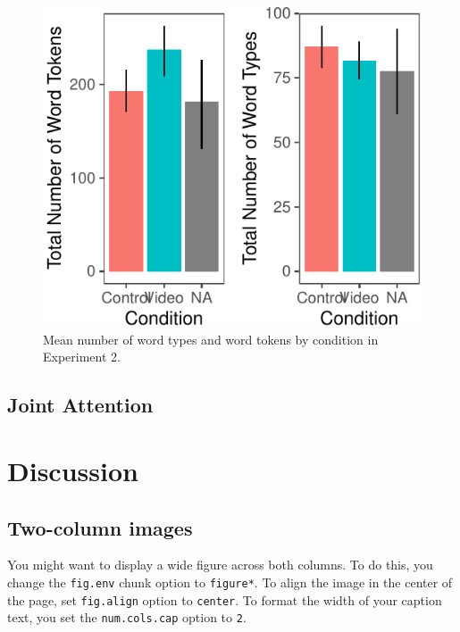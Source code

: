 \documentclass[10pt, letterpaper]{article}
\newenvironment{CodeChunk}{}{}
\begin{document}
\begin{CodeChunk}
\begin{figure}[H]

{\centering \includegraphics{figs/e2token-type-1} 

}

\caption[Mean number of word types and word tokens by condition in Experiment 2]{Mean number of word types and word tokens by condition in Experiment 2.}\label{fig:e2token-type}
\end{figure}
\end{CodeChunk}

\subsection{Joint Attention}\label{joint-attention-1}

\section{Discussion}\label{discussion-1}

\subsection{Two-column images}\label{two-column-images}

You might want to display a wide figure across both columns. To do this,
you change the \texttt{fig.env} chunk option to \texttt{figure*}. To
align the image in the center of the page, set \texttt{fig.align} option
to \texttt{center}. To format the width of your caption text, you set
the \texttt{num.cols.cap} option to \texttt{2}.
\end{document}
